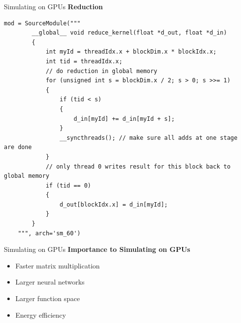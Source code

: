 \documentclass[10pt,appendixnumberbeamer]{beamer}
\begin{document}
\begin{frame}[fragile]{Simulating on GPUs}
\textbf{Reduction}
\begin{lstlisting}
mod = SourceModule("""
        __global__ void reduce_kernel(float *d_out, float *d_in)
        {
            int myId = threadIdx.x + blockDim.x * blockIdx.x;
            int tid = threadIdx.x;
            // do reduction in global memory
            for (unsigned int s = blockDim.x / 2; s > 0; s >>= 1)
            {
                if (tid < s)
                {
                    d_in[myId] += d_in[myId + s];
                }
                __syncthreads(); // make sure all adds at one stage are done
            }
            // only thread 0 writes result for this block back to global memory
            if (tid == 0)
            {
                d_out[blockIdx.x] = d_in[myId];
            }
        }
	""", arch='sm_60')
\end{lstlisting}
\end{frame}

\begin{frame}{Simulating on GPUs}
\textbf{Importance to Simulating on GPUs}
\begin{itemize}
\item Faster matrix multiplication
\item Larger neural networks
\item Larger function space 
\item Energy efficiency 
\end{itemize}
\end{frame}

\end{document}
